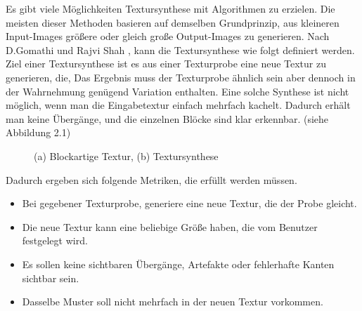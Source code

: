 \documentclass[12pt, a4paper,twoside,openright]{report} %
\begin{document}
Es gibt viele Möglichkeiten Textursynthese mit Algorithmen zu erzielen.
Die meisten dieser Methoden basieren auf demselben Grundprinzip, aus kleineren Input-Images größere oder gleich große Output-Images zu generieren.
Nach D.Gomathi und Rajvi Shah \cite[S.1]{GomathiShah2009}, kann die Textursynthese wie folgt definiert werden.
\newline
Ziel einer Textursynthese ist es aus einer Texturprobe eine neue Textur zu generieren, die, 
Das Ergebnis muss der Texturprobe ähnlich sein aber dennoch in der Wahrnehmung genügend Variation enthalten.
Eine solche Synthese ist nicht möglich, wenn man die Eingabetextur einfach mehrfach kachelt.
Dadurch erhält man keine  Übergänge, und die einzelnen Blöcke sind klar erkennbar. {(siehe Abbildung 2.1)}

\begin{figure}[H]
    \centering
    \qquad
    \caption{(a) Blockartige Textur, (b) Textursynthese}%
\end{figure}

\noindent Dadurch ergeben sich folgende Metriken, die erfüllt werden müssen.

\begin{itemize}
    \item Bei gegebener Texturprobe, generiere eine neue Textur, die der Probe gleicht.
    \item Die neue Textur kann eine beliebige Größe haben, die vom Benutzer festgelegt wird.
    \item Es sollen keine sichtbaren Übergänge, Artefakte oder fehlerhafte Kanten sichtbar sein.
    \item Dasselbe Muster soll nicht mehrfach in der neuen Textur vorkommen. \cite[S.2]{GomathiShah2009}
\end{itemize}
\end{document}
